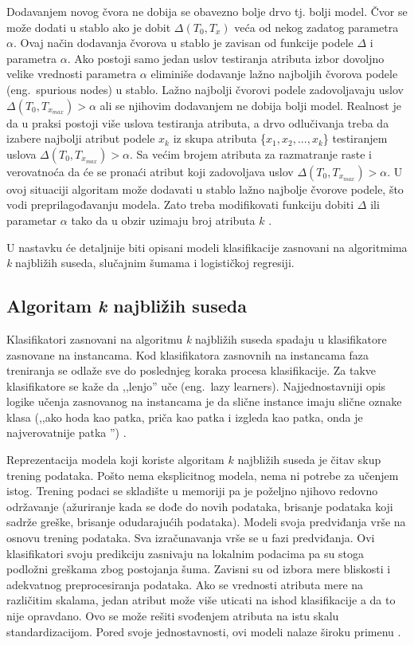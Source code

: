 \documentclass[12pt,oneside]{memoir}
\begin{document}
\begin{description}
Dodavanjem novog čvora ne dobija se obavezno bolje drvo tj. bolji model. Čvor se može dodati u stablo ako je dobit $\Delta(T_0, T_x)$ veća od nekog zadatog parametra $\alpha$. Ovaj način dodavanja čvorova u stablo je zavisan od funkcije podele $\Delta$ i parametra $\alpha$. Ako postoji samo jedan uslov testiranja atributa izbor dovoljno velike vrednosti parametra $\alpha$ eliminiše dodavanje lažno najboljih čvorova podele (eng.~spurious nodes) u stablo. Lažno najbolji čvorovi podele zadovoljavaju uslov $\Delta(T_0, T_{x_{max}})>\alpha$ ali se njihovim dodavanjem ne dobija bolji model. Realnost je da u praksi postoji više uslova testiranja atributa, a drvo odlučivanja treba da izabere najbolji atribut podele $x_k$ iz skupa atributa \{$x_1, x_2,...,x_k$\} testiranjem uslova $\Delta(T_0, T_{x_{max}})>\alpha$. Sa većim brojem atributa za razmatranje raste i verovatnoća da će se pronaći atribut koji zadovoljava uslov $\Delta(T_0, T_{x_{max}})>\alpha$. U ovoj situaciji algoritam može dodavati u stablo lažno najbolje čvorove podele, što vodi preprilagođavanju modela. Zato treba modifikovati funkciju dobiti $\Delta$ ili parametar $\alpha$ tako da u obzir uzimaju broj atributa $k$ \cite{mitic}.
\end{description}

U nastavku će detaljnije biti opisani modeli klasifikacije zasnovani na algoritmima \textit{k} najbližih suseda, 
slučajnim šumama i logističkoj regresiji.

\subsection{Algoritam \textit{k} najbližih suseda}

Klasifikatori zasnovani na algoritmu \textit{k} najbližih suseda spadaju u klasifikatore zasnovane na instancama. Kod klasifikatora zasnovnih na instancama faza treniranja se odlaže sve do poslednjeg koraka procesa klasifikacije. Za takve klasifikatore se kaže da ,,lenjo'' uče (eng.~lazy learners). Najjednostavniji opis logike učenja zasnovanog na instancama je da slične instance imaju slične oznake klasa (,,ako hoda kao patka, priča kao patka i izgleda kao patka, onda je najverovatnije patka \cite{mitic}'') \cite{aggarwal}.

Reprezentacija modela koji koriste algoritam $k$ najbližih suseda je čitav skup trening podataka. Pošto nema eksplicitnog modela, nema ni potrebe za učenjem istog. Trening podaci se skladište u memoriji pa je poželjno njihovo redovno održavanje (ažuriranje kada se dođe do novih podataka, brisanje podataka koji sadrže greške, brisanje odudarajućih podataka). Modeli svoja predviđanja vrše na osnovu trening podataka. Sva izračunavanja vrše se u fazi predviđanja. Ovi klasifikatori svoju predikciju zasnivaju na lokalnim podacima pa su stoga podložni greškama zbog postojanja šuma. Zavisni su od izbora mere bliskosti i adekvatnog preprocesiranja podataka. Ako se vrednosti atributa mere na različitim skalama, jedan atribut može više uticati na ishod klasifikacije a da to nije opravdano. Ovo se može rešiti svođenjem atributa na istu skalu standardizacijom. Pored svoje jednostavnosti, ovi modeli nalaze široku primenu \cite{mlm, mladen, mitic}.
\end{document}
